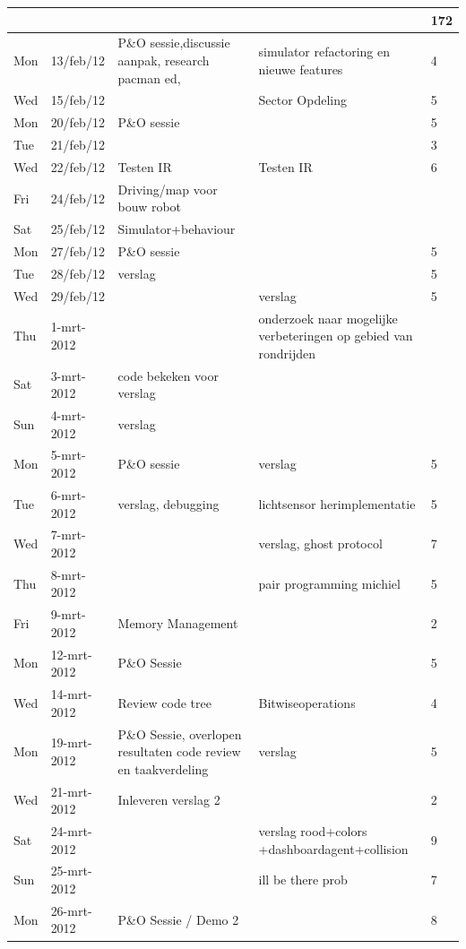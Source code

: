 \documentclass[12pt,a4paper]{report}
\begin{document}
\begin{landscape}
\begin{longtable}{llp{7cm}p{10cm}l}
\hline
 &  &  &  & 172 \\ 
\hline
Mon & 13/feb/12 & P\&O sessie,discussie aanpak, research pacman ed,  & simulator refactoring en nieuwe features & 4 \\ 
\hline
Wed & 15/feb/12 &  & Sector Opdeling & 5 \\ 
\hline
Mon & 20/feb/12 & P\&O sessie &  & 5 \\ 
\hline
Tue & 21/feb/12 &  &  & 3 \\ 
\hline
Wed & 22/feb/12 & Testen IR & Testen IR & 6 \\ 
\hline
Fri & 24/feb/12 & Driving/map voor bouw robot &  &  \\ 
\hline
Sat & 25/feb/12 & Simulator+behaviour &  &  \\ 
\hline
Mon & 27/feb/12 & P\&O sessie &  & 5 \\ 
\hline
Tue & 28/feb/12 & verslag &  & 5 \\ 
\hline
Wed & 29/feb/12 &  & verslag & 5 \\ 
\hline
Thu & 1-mrt-2012 &  & onderzoek naar mogelijke verbeteringen op gebied van rondrijden &  \\ 
\hline
Sat & 3-mrt-2012 & code bekeken voor verslag &  &  \\ 
\hline
Sun & 4-mrt-2012 & verslag &  &  \\ 
\hline
Mon & 5-mrt-2012 & P\&O sessie & verslag & 5 \\ 
\hline
Tue & 6-mrt-2012 & verslag, debugging & lichtsensor herimplementatie & 5 \\ 
\hline
Wed & 7-mrt-2012 &  & verslag, ghost protocol & 7 \\ 
\hline
Thu & 8-mrt-2012 &  & pair programming michiel & 5 \\ 
\hline
Fri & 9-mrt-2012 & Memory Management &  & 2 \\ 
\hline
Mon & 12-mrt-2012 & P\&O Sessie &  & 5 \\ 
\hline
Wed & 14-mrt-2012 & Review code tree  & Bitwiseoperations & 4 \\ 
\hline
Mon & 19-mrt-2012 & P\&O Sessie, overlopen resultaten code review en taakverdeling & verslag  & 5 \\ 
\hline
Wed & 21-mrt-2012 & Inleveren verslag 2 &  & 2 \\ 
\hline
Sat & 24-mrt-2012 &  & verslag rood+colors +dashboardagent+collision & 9 \\ 
\hline
Sun & 25-mrt-2012 &  & ill be there prob & 7 \\ 
\hline
Mon & 26-mrt-2012 & P\&O Sessie / Demo 2 &  & 8 \\ 

\end{longtable}
\end{landscape}
\end{document}
